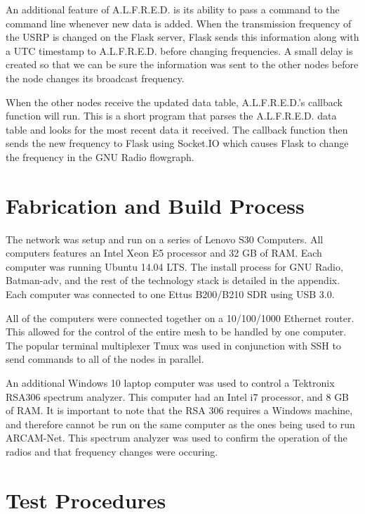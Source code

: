 An additional feature of A.L.F.R.E.D. is its ability to pass a command to the command line whenever new data is added. When the transmission frequency of the USRP is changed on the Flask server, Flask sends this information along with a UTC timestamp to A.L.F.R.E.D. before changing frequencies. A small delay is created so that we can be sure the information was sent to the other nodes before the node changes its broadcast frequency.  

 When the other nodes receive the updated data table, A.L.F.R.E.D.'s callback function will run. This is a short program that parses the A.L.F.R.E.D. data table and looks for the most recent data it received. The callback function then sends the new frequency to Flask using Socket.IO which causes Flask to change the frequency in the GNU Radio flowgraph.   

\section{Fabrication and Build Process}

The network was setup and run on a series of Lenovo S30 Computers. All computers features an Intel Xeon E5 processor and 32 GB of RAM. Each computer was running Ubuntu 14.04 LTS. The install process for GNU Radio, Batman-adv, and the rest of the technology stack is detailed in the appendix. Each computer was connected to one Ettus B200/B210 SDR using USB 3.0. 

All of the computers were connected together on a 10/100/1000 Ethernet router. This allowed for the control of the entire mesh to be handled by one computer. The popular terminal multiplexer Tmux was used in conjunction with SSH to send commands to all of the nodes in parallel. 

An additional Windows 10 laptop computer was used to control a Tektronix RSA306 spectrum analyzer. This computer had an Intel i7 processor, and 8 GB of RAM. It is important to note that the RSA 306 requires a Windows machine, and therefore cannot be run on the same computer as the ones being used to run ARCAM-Net. This spectrum analyzer was used to confirm the operation of the radios and that frequency changes were occuring. 


\section{Test Procedures}

